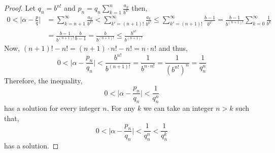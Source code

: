 \documentclass{article}
\theoremstyle{theorem}
\theoremstyle{definition}
\theoremstyle{definition}
\theoremstyle{remark}
\theoremstyle{definition}
\theoremstyle{remark}
\begin{document}
\begin{proof}
Let $q_n = b^{n!}$ and $p_n = q_n \sum\limits_{k = 1}^n \frac{a_k}{b^{k!}}$ then,
\begin{align*}
0 < \Big| \alpha - \frac{p}{q} \Big| & = \sum_{k = n + 1}^\infty \frac{a_k}{b^{k!}} <   \sum_{k' = (n + 1)!}^\infty \frac{a_k}{b^{k'}} \le \sum_{k' = (n + 1)!}^\infty \frac{b-1}{b^{k'}} = \frac{b - 1}{b^{(n+1)!}} \sum_{k = 0}^\infty \frac{1}{b^{k}} \\ & = \frac{b - 1}{b^{(n+1)!}} \frac{b}{b-1} = \frac{b}{b^{(n+1)!}} \le \frac{b^{n!}}{b^{(n+1)!}}
\end{align*}
Now, $(n+1)! - n! = (n+1) \cdot n! - n! = n \cdot n!$ and thus,
\[ 0 < \Big| \alpha - \frac{p_n}{q_n} \Big| < \frac{b^{n!}}{b^{(n+1)!}} = \frac{1}{b^{n \cdot n!}} = \frac{1}{(b^{n!})^n} = \frac{1}{q_n^n}\]
Therefore, the inequality,
\[0 < \Big| \alpha - \frac{p_n}{q_n} \Big| < \frac{1}{q_n^n}\]
has a solution for every integer $n$. For any $k$ we can take an integer $n > k$ such that,
\[0 < \Big| \alpha - \frac{p_n}{q_n} \Big| < \frac{1}{q_n^n} < \frac{1}{q_n^k}\]
has a solution.  
\end{proof}
\end{document}
